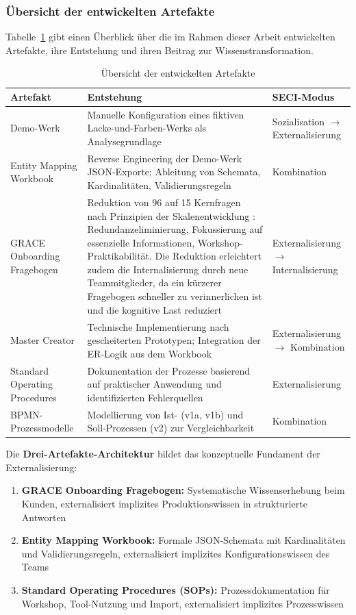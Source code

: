 \subsubsection*{Übersicht der entwickelten Artefakte}

Tabelle~\ref{tab:ArtefaktUebersicht} gibt einen Überblick über die im Rahmen dieser Arbeit entwickelten Artefakte, ihre Entstehung und ihren Beitrag zur Wissenstransformation.

\begin{table}[h]
\centering
\caption{Übersicht der entwickelten Artefakte}
\label{tab:ArtefaktUebersicht}
\begin{tabular}{p{3.2cm}p{6cm}p{3.5cm}}
\hline
\textbf{Artefakt} & \textbf{Entstehung} & \textbf{SECI-Modus} \\
\hline
Demo-Werk & Manuelle Konfiguration eines fiktiven Lacke-und-Farben-Werks als Analysegrundlage & Sozialisation $\rightarrow$ Externalisierung \\
\hline
Entity Mapping Workbook & Reverse Engineering der Demo-Werk JSON-Exporte; Ableitung von Schemata, Kardinalitäten, Validierungsregeln & Kombination \\
\hline
GRACE Onboarding Fragebogen & Reduktion von 96 auf 15 Kernfragen nach Prinzipien der Skalenentwicklung \citep{devellis:scale_development2017}: Redundanzeliminierung, Fokussierung auf essenzielle Informationen, Workshop-Praktikabilität. Die Reduktion erleichtert zudem die Internalisierung durch neue Teammitglieder, da ein kürzerer Fragebogen schneller zu verinnerlichen ist und die kognitive Last reduziert & Externalisierung $\rightarrow$ Internalisierung \\
\hline
Master Creator & Technische Implementierung nach gescheiterten Prototypen; Integration der ER-Logik aus dem Workbook & Externalisierung $\rightarrow$ Kombination \\
\hline
Standard Operating Procedures & Dokumentation der Prozesse basierend auf praktischer Anwendung und identifizierten Fehlerquellen & Externalisierung \\
\hline
BPMN-Prozessmodelle & Modellierung von Ist- (v1a, v1b) und Soll-Prozessen (v2) zur Vergleichbarkeit & Kombination \\
\hline
\end{tabular}
\end{table}

Die \textbf{Drei-Artefakte-Architektur} bildet das konzeptuelle Fundament der Externalisierung:

\begin{enumerate}
    \item \textbf{GRACE Onboarding Fragebogen:} Systematische Wissenserhebung beim Kunden, externalisiert implizites Produktionswissen in strukturierte Antworten
    \item \textbf{Entity Mapping Workbook:} Formale JSON-Schemata mit Kardinalitäten und Validierungsregeln, externalisiert implizites Konfigurationswissen des Teams
    \item \textbf{Standard Operating Procedures (SOPs):} Prozessdokumentation für Workshop, Tool-Nutzung und Import, externalisiert implizites Prozesswissen
\end{enumerate}


